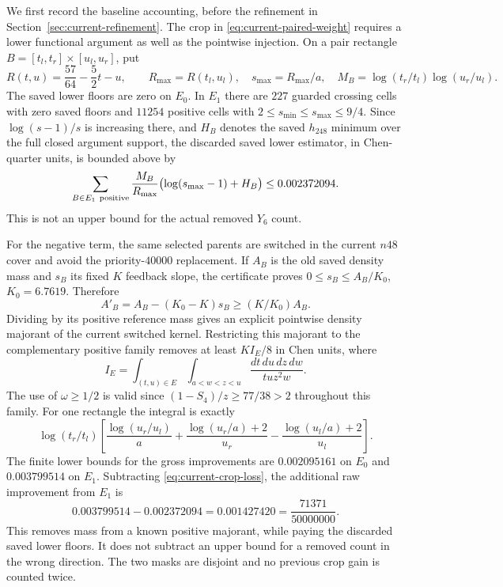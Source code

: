 We first record the baseline accounting, before the refinement in
Section~\ref{sec:current-refinement}.  The crop in
\eqref{eq:current-paired-weight} requires a lower
functional argument as well as the pointwise injection.  On a pair
rectangle $B=[t_l,t_r]\times[u_l,u_r]$, put
\[
 R(t,u)=\frac{57}{64}-\frac52t-u,\qquad
 R_{\max}=R(t_l,u_l),\quad s_{\max}=R_{\max}/a,\quad
 M_B=\log(t_r/t_l)\log(u_r/u_l).
\]
The saved lower floors are zero on $E_0$.  In $E_1$ there are
$227$ guarded crossing cells with zero saved floors and $11254$
positive cells with $2\le s_{\min}\le s_{\max}\le9/4$.
Since $\log(s-1)/s$ is increasing there, and $H_B$ denotes the
saved $h_{248}$ minimum over the full closed argument support,
the discarded saved lower estimator, in Chen-quarter units, is
bounded above by
\begin{equation}
 \sum_{B\in E_1\ {\rm positive}}
       \frac{M_B}{R_{\max}}\bigl(\log(s_{\max}-1)+H_B\bigr)
       \le 0.002372094.
 \label{eq:current-crop-loss}
\end{equation}
This is not an upper bound for the actual removed $Y_6$ count.

For the negative term, the same selected parents are switched in
the current $n48$ cover and avoid the priority-$40000$ replacement.
If $A_B$ is the old saved density mass and $s_B$ its fixed $K$
feedback slope, the certificate proves
$0\le s_B\le A_B/K_0$, $K_0=6.7619$.  Therefore
\[
 A'_B=A_B-(K_0-K)s_B\ge(K/K_0)A_B.
\]
Dividing by its positive reference mass gives an explicit
pointwise density majorant of the current switched kernel.
Restricting this majorant to the complementary positive family
removes at least $KI_E/8$ in Chen units, where
\begin{equation}
 I_E=\int_{(t,u)\in E}\int_{a<w<z<u}
                      \frac{dt\,du\,dz\,dw}{tu z^2w}.
 \label{eq:current-crop-integral}
\end{equation}
The use of $\omega\ge1/2$ is valid since
$(1-S_4)/z\ge77/38>2$ throughout this family.  For one rectangle
the integral is exactly
\[
 \log(t_r/t_l)\left[
 \frac{\log(u_r/u_l)}a+\frac{\log(u_r/a)+2}{u_r}
                         -\frac{\log(u_l/a)+2}{u_l}\right].
\]
The finite lower bounds for the gross improvements are
$0.002095161$ on $E_0$ and $0.003799514$ on $E_1$.
Subtracting \eqref{eq:current-crop-loss}, the additional raw
improvement from $E_1$ is
\begin{equation}
          0.003799514-0.002372094
             =0.001427420=\frac{71371}{50000000}.
 \label{eq:current-new-crop-gain}
\end{equation}
This removes mass from a known positive majorant, while paying the
discarded saved lower floors.  It does not subtract an upper bound
for a removed count in the wrong direction.  The two masks are
disjoint and no previous crop gain is counted twice.

